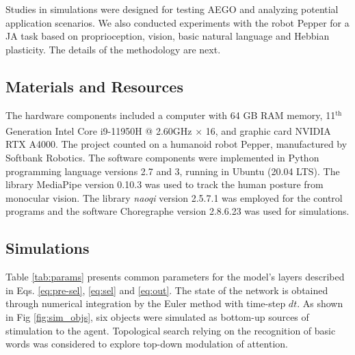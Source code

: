 \documentclass[letterpaper, 10 pt, conference]{ieeeconf}  %
\begin{document}
	Studies in simulations were designed for testing AEGO and analyzing potential application scenarios. We also conducted experiments with the robot Pepper for a JA task based on proprioception, vision, basic natural language and Hebbian plasticity. The details of the methodology are next.

	\subsection{Materials and Resources}
	
	The hardware components included a computer with 64 GB RAM memory, 11${}^\mathrm{th}$ Generation Intel\textsuperscript{\textregistered} Core\textsuperscript{\texttrademark} i9-11950H @ 2.60GHz × 16, and graphic card NVIDIA RTX A4000. The project counted on a humanoid robot Pepper, manufactured by Softbank Robotics. The software components were implemented in Python programming language versions 2.7 and 3, running in Ubuntu (20.04 LTS). The library MediaPipe version 0.10.3 was used to track the human posture from monocular vision. The library \textit{naoqi} version 2.5.7.1 was employed for the control programs and the software Choregraphe version 2.8.6.23 was used for simulations. 
	
	\subsection{Simulations}
	
	Table \ref{tab:params} presents common parameters for the model's layers described in Eqs. \eqref{eq:pre-sel}, \eqref{eq:sel} and \eqref{eq:out}. The state of the network is obtained through numerical integration by the Euler method with time-step $dt$. As shown in Fig \ref{fig:sim_objs}, six objects were simulated as bottom-up sources of stimulation to the agent. Topological search relying on the recognition of basic words was considered to explore top-down modulation of attention. %
	
	\renewcommand{\arraystretch}{1.2} %
	
\end{document}

